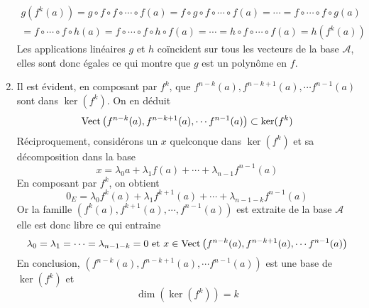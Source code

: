\begin{enumerate}
\begin{multline*}
g(f^k(a))=g\circ f \circ f \circ \cdots \circ f (a) 
= f \circ g \circ f \circ \cdots \circ f(a) = \cdots 
= f \circ \cdots \circ f \circ g(a) \\
= f \circ \cdots \circ f \circ h(a)
= f \circ \cdots \circ f \circ h \circ f (a)
= \cdots 
=  h \circ f \circ \cdots \circ f (a) = h(f^k(a))
\end{multline*}
Les applications linéaires $g$ et $h$ coïncident sur tous les vecteurs de la base $\mathcal{A}$, elles sont donc égales ce qui montre que $g$ est un polynôme en $f$.
 \item Il est évident, en composant par $f^k$, que $f^{n-k}(a), f^{n-k+1}(a),\cdots f^{n-1}(a)$ sont dans $\ker(f^k)$. On en déduit
\begin{displaymath}
 \operatorname{Vect}\left( f^{n-k}(a), f^{n-k+1}(a),\cdots f^{n-1}(a)\right) \subset \ker(f^k) 
\end{displaymath}
Réciproquement, considérons un $x$ quelconque dans $\ker(f^k)$ et sa décomposition dans la base
\begin{displaymath}
 x = \lambda_0 a + \lambda_1 f(a) + \cdots + \lambda_{n-1}f^{n-1}(a)
\end{displaymath}
En composant par $f^k$, on obtient
\begin{displaymath}
 0_E = \lambda_0 f^k(a) + \lambda_1 f^{k+1}(a) + \cdots + \lambda_{n-1-k}f^{n-1}(a)
\end{displaymath}
Or la famille $\left(f^k(a), f^{k+1}(a), \cdots ,f^{n-1}(a) \right)$ est extraite de la base $\mathcal{A}$ elle est donc libre ce qui entraine 
\begin{displaymath}
\lambda_0 = \lambda_1 = \cdots = \lambda_{n-1-k}=0 \text{ et } 
x\in \operatorname{Vect}\left( f^{n-k}(a), f^{n-k+1}(a),\cdots f^{n-1}(a)\right) 
\end{displaymath}
En conclusion, $\left( f^{n-k}(a), f^{n-k+1}(a),\cdots f^{n-1}(a)\right)$ est une base de $\ker(f^k)$ et
\begin{displaymath}
\dim(\ker (f^k))=k 
\end{displaymath}
\end{enumerate}

